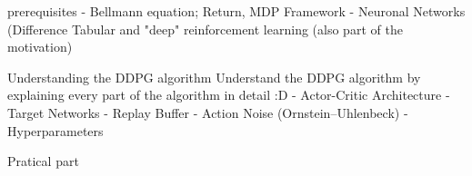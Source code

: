 prerequisites
- Bellmann equation; Return, MDP Framework
- Neuronal Networks
  (Difference Tabular and "deep" reinforcement learning (also part of the motivation)
  
 
Understanding the DDPG algorithm
Understand the DDPG algorithm by explaining every part of the algorithm in detail :D
- Actor-Critic Architecture
- Target Networks
- Replay Buffer
- Action Noise (Ornstein–Uhlenbeck)
- Hyperparameters




Pratical part